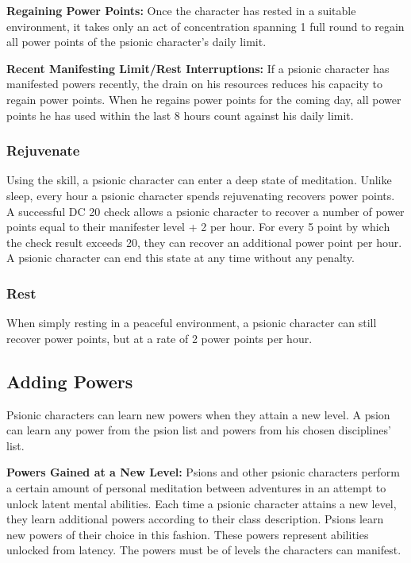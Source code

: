 \textbf{Regaining Power Points:} Once the character has rested in a suitable environment, it takes only an act of concentration spanning 1 full round to regain all power points of the psionic character's daily limit.

\textbf{Recent Manifesting Limit/Rest Interruptions:} If a psionic character has manifested powers recently, the drain on his resources reduces his capacity to regain power points. When he regains power points for the coming day, all power points he has used within the last 8 hours count against his daily limit.

\subsubsection{Rejuvenate}
Using the  skill, a psionic character can enter a deep state of meditation. Unlike sleep, every hour a psionic character spends rejuvenating recovers power points. A successful  DC 20 check allows a psionic character to recover a number of power points equal to their manifester level + 2 per hour. For every 5 point by which the check result exceeds 20, they can recover an additional power point per hour. A psionic character can end this state at any time without any penalty.

\subsubsection{Rest}
When simply resting in a peaceful environment, a psionic character can still recover power points, but at a rate of 2 power points per hour.

\subsection{Adding Powers}
Psionic characters can learn new powers when they attain a new level. A psion can learn any power from the psion list and powers from his chosen disciplines' list. %

\textbf{Powers Gained at a New Level:} Psions and other psionic characters perform a certain amount of personal meditation between adventures in an attempt to unlock latent mental abilities. Each time a psionic character attains a new level, they learn additional powers according to their class description. Psions learn new powers of their choice in this fashion. These powers represent abilities unlocked from latency. The powers must be of levels the characters can manifest.

